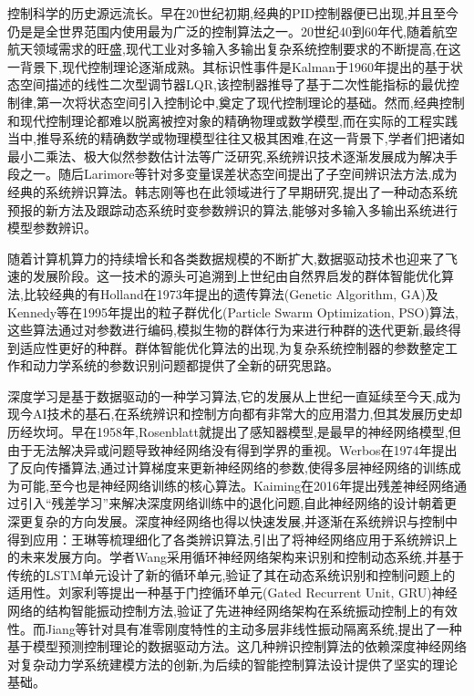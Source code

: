 \documentclass{scrbook}
\begin{document}
{控制科学的历史源远流长。早在20世纪初期,经典的PID控制器便已出现,并且至今仍是是全世界范围内使用最为广泛的控制算法之一\cite{bib4}。20世纪40到60年代,随着航空航天领域需求的旺盛,现代工业对多输入多输出复杂系统控制要求的不断提高,在这一背景下,现代控制理论逐渐成熟。其标识性事件是Kalman于1960年提出的基于状态空间描述的线性二次型调节器LQR,该控制器推导了基于二次性能指标的最优控制律\cite{bib5},第一次将状态空间引入控制论中,奠定了现代控制理论的基础。然而,经典控制和现代控制理论都难以脱离被控对象的精确物理或数学模型,而在实际的工程实践当中,推导系统的精确数学或物理模型往往又极其困难,在这一背景下,学者们把诸如最小二乘法、极大似然参数估计法等广泛研究,系统辨识技术逐渐发展成为解决手段之一。随后Larimore等\cite{bib6}针对多变量误差状态空间提出了子空间辨识法方法,成为经典的系统辨识算法。韩志刚等\cite{bib7,bib7_2}也在此领域进行了早期研究,提出了一种动态系统预报的新方法及跟踪动态系统时变参数辨识的算法,能够对多输入多输出系统进行模型参数辨识。

随着计算机算力的持续增长和各类数据规模的不断扩大,数据驱动技术也迎来了飞速的发展阶段。这一技术的源头可追溯到上世纪由自然界启发的群体智能优化算法,比较经典的有Holland\cite{bib9}在1973年提出的遗传算法(Genetic Algorithm, GA)及Kennedy等\cite{bib10}在1995年提出的粒子群优化(Particle Swarm Optimization, PSO)算法,这些算法通过对参数进行编码,模拟生物的群体行为来进行种群的迭代更新,最终得到适应性更好的种群。群体智能优化算法的出现,为复杂系统控制器的参数整定工作和动力学系统的参数识别问题都提供了全新的研究思路。

深度学习是基于数据驱动的一种学习算法,它的发展从上世纪一直延续至今天,成为现今AI技术的基石,在系统辨识和控制方向都有非常大的应用潜力,但其发展历史却历经坎坷。早在1958年,Rosenblatt\cite{bib11}就提出了感知器模型,是最早的神经网络模型,但由于无法解决异或问题导致神经网络没有得到学界的重视。Werbos\cite{bib12}在1974年提出了反向传播算法,通过计算梯度来更新神经网络的参数,使得多层神经网络的训练成为可能,至今也是神经网络训练的核心算法。Kaiming在2016年提出残差神经网络\cite{bib13}通过引入``残差学习''来解决深度网络训练中的退化问题,自此神经网络的设计朝着更深更复杂的方向发展。深度神经网络也得以快速发展,并逐渐在系统辨识与控制中得到应用：王琳\cite{bib14}等梳理细化了各类辨识算法,引出了将神经网络应用于系统辨识上的未来发展方向。学者Wang\cite{bib15}采用循环神经网络架构来识别和控制动态系统,并基于传统的LSTM单元设计了新的循环单元,验证了其在动态系统识别和控制问题上的适用性。刘家利等\cite{bib16}提出一种基于门控循环单元(Gated Recurrent Unit, GRU)神经网络的结构智能振动控制方法,验证了先进神经网络架构在系统振动控制上的有效性。而Jiang等\cite{bib17}针对具有准零刚度特性的主动多层非线性振动隔离系统,提出了一种基于模型预测控制理论的数据驱动方法。这几种辨识控制算法的依赖深度神经网络对复杂动力学系统建模方法的创新,为后续的智能控制算法设计提供了坚实的理论基础。

}
\end{document}
